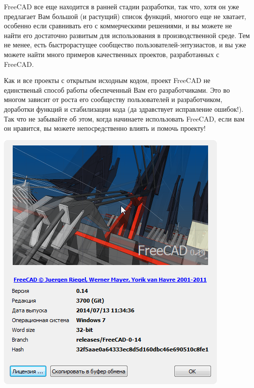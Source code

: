 FreeCAD все еще находится в ранней стадии разработки, так что, хотя он уже
предлагает Вам большой (и растущий) список функций, многого еще не хватает,
особенно если сравнивать его с коммерческими решениями, и вы можете не найти его
достаточно развитым для использования в производственной среде. Тем не менее,
есть быстрорастущее сообщество пользователей-энтузиастов, и вы уже можете найти
много примеров качественных проектов, разработанных с FreeCAD.

Как и все проекты с открытым исходным кодом, проект FreeCAD не единственый
способ работы обеспеченный Вам его разработчиками. Это во многом зависит от
роста его сообществу пользователей и разработчиком, доработки функций и
стабилизации кода (да здравствует исправление ошибок!). Так что не забывайте об
этом, когда начинаете использовать FreeCAD, если вам он нравится, вы можете
непосредственно влиять и помочь проекту!






\includegraphics[height=0.8\textheight]{freecad/about.png}

% 
% 
% 
% 
% 
% 
